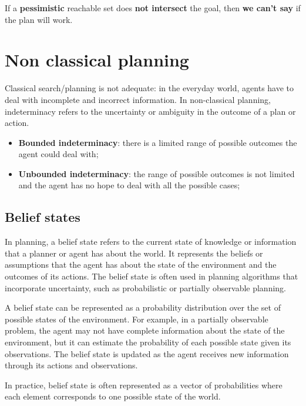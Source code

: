 \documentclass{article}
\begin{document}
\begin{flushleft}
If a \textbf{pessimistic} reachable set does \textbf{not intersect} the goal, then \textbf{we can't say} if the plan will work. \\
\end{flushleft}

\newpage

\section{Non classical planning}

Classical search/planning is not adequate: in the everyday world, agents have to deal with incomplete and incorrect information.
In non-classical planning, indeterminacy refers to the uncertainty or ambiguity in the outcome of a plan or action. 

\begin{itemize}
    \item \textbf{Bounded indeterminacy}: there is a limited range of possible outcomes the agent could deal with;
    \item \textbf{Unbounded indeterminacy}: the range of possible outcomes is not limited and the agent has no hope to deal with all the possible cases;
\end{itemize}


\subsection{Belief states}

In planning, a belief state refers to the current state of knowledge or information that a planner or agent has about the world. It represents the beliefs or assumptions that the agent has about the state of the environment and the outcomes of its actions. The belief state is often used in planning algorithms that incorporate uncertainty, such as probabilistic or partially observable planning.

A belief state can be represented as a probability distribution over the set of possible states of the environment. For example, in a partially observable problem, the agent may not have complete information about the state of the environment, but it can estimate the probability of each possible state given its observations. The belief state is updated as the agent receives new information through its actions and observations.

In practice, belief state is often represented as a vector of probabilities where each element corresponds to one possible state of the world.
\end{document}
